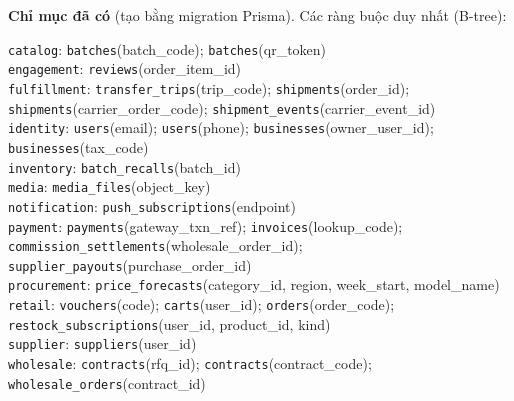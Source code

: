 \noindent\textbf{Chỉ mục đã có} (tạo bằng migration Prisma). Các ràng buộc duy nhất (B-tree):

\begin{flushleft}
\texttt{catalog}: \texttt{batches}(batch\_\allowbreak{}code); \texttt{batches}(qr\_\allowbreak{}token) \\
\texttt{engagement}: \texttt{reviews}(order\_\allowbreak{}item\_\allowbreak{}id) \\
\texttt{fulfillment}: \texttt{transfer\_\allowbreak{}trips}(trip\_\allowbreak{}code); \texttt{shipments}(order\_\allowbreak{}id); \texttt{shipments}(carrier\_\allowbreak{}order\_\allowbreak{}code); \texttt{shipment\_\allowbreak{}events}(carrier\_\allowbreak{}event\_\allowbreak{}id) \\
\texttt{identity}: \texttt{users}(email); \texttt{users}(phone); \texttt{businesses}(owner\_\allowbreak{}user\_\allowbreak{}id); \texttt{businesses}(tax\_\allowbreak{}code) \\
\texttt{inventory}: \texttt{batch\_\allowbreak{}recalls}(batch\_\allowbreak{}id) \\
\texttt{media}: \texttt{media\_\allowbreak{}files}(object\_\allowbreak{}key) \\
\texttt{notification}: \texttt{push\_\allowbreak{}subscriptions}(endpoint) \\
\texttt{payment}: \texttt{payments}(gateway\_\allowbreak{}txn\_\allowbreak{}ref); \texttt{invoices}(lookup\_\allowbreak{}code); \texttt{commission\_\allowbreak{}settlements}(wholesale\_\allowbreak{}order\_\allowbreak{}id); \texttt{supplier\_\allowbreak{}payouts}(purchase\_\allowbreak{}order\_\allowbreak{}id) \\
\texttt{procurement}: \texttt{price\_\allowbreak{}forecasts}(category\_\allowbreak{}id, region, week\_\allowbreak{}start, model\_\allowbreak{}name) \\
\texttt{retail}: \texttt{vouchers}(code); \texttt{carts}(user\_\allowbreak{}id); \texttt{orders}(order\_\allowbreak{}code); \texttt{restock\_\allowbreak{}subscriptions}(user\_\allowbreak{}id, product\_\allowbreak{}id, kind) \\
\texttt{supplier}: \texttt{suppliers}(user\_\allowbreak{}id) \\
\texttt{wholesale}: \texttt{contracts}(rfq\_\allowbreak{}id); \texttt{contracts}(contract\_\allowbreak{}code); \texttt{wholesale\_\allowbreak{}orders}(contract\_\allowbreak{}id) \\
\end{flushleft}

